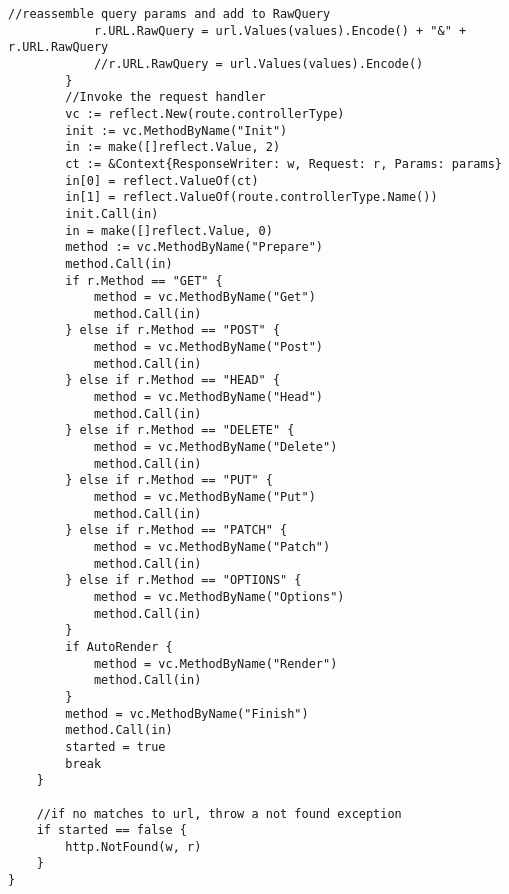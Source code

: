 \begin{lstlisting}[numbers=none]
            //reassemble query params and add to RawQuery
            r.URL.RawQuery = url.Values(values).Encode() + "&" + r.URL.RawQuery
            //r.URL.RawQuery = url.Values(values).Encode()
        }
        //Invoke the request handler
        vc := reflect.New(route.controllerType)
        init := vc.MethodByName("Init")
        in := make([]reflect.Value, 2)
        ct := &Context{ResponseWriter: w, Request: r, Params: params}
        in[0] = reflect.ValueOf(ct)
        in[1] = reflect.ValueOf(route.controllerType.Name())
        init.Call(in)
        in = make([]reflect.Value, 0)
        method := vc.MethodByName("Prepare")
        method.Call(in)
        if r.Method == "GET" {
            method = vc.MethodByName("Get")
            method.Call(in)
        } else if r.Method == "POST" {
            method = vc.MethodByName("Post")
            method.Call(in)
        } else if r.Method == "HEAD" {
            method = vc.MethodByName("Head")
            method.Call(in)
        } else if r.Method == "DELETE" {
            method = vc.MethodByName("Delete")
            method.Call(in)
        } else if r.Method == "PUT" {
            method = vc.MethodByName("Put")
            method.Call(in)
        } else if r.Method == "PATCH" {
            method = vc.MethodByName("Patch")
            method.Call(in)
        } else if r.Method == "OPTIONS" {
            method = vc.MethodByName("Options")
            method.Call(in)
        }
        if AutoRender {
            method = vc.MethodByName("Render")
            method.Call(in)
        }
        method = vc.MethodByName("Finish")
        method.Call(in)
        started = true
        break
    }

    //if no matches to url, throw a not found exception
    if started == false {
        http.NotFound(w, r)
    }
}
\end{lstlisting}
